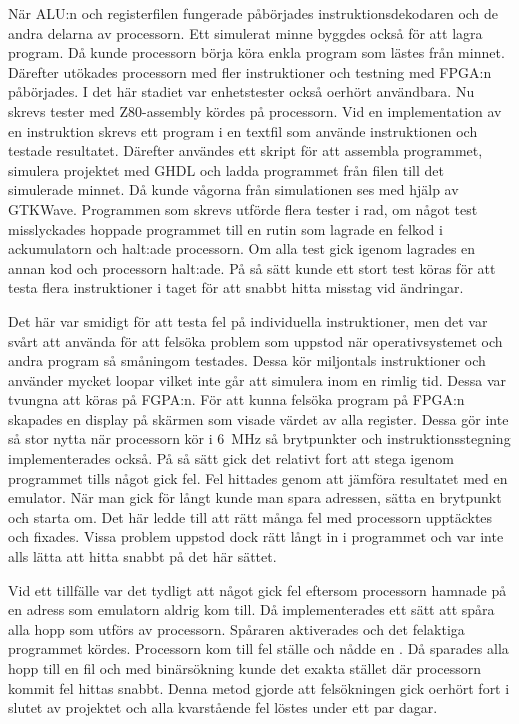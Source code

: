 \documentclass[main.tex]{subfiles}
\begin{document}
När ALU:n och registerfilen fungerade påbörjades instruktionsdekodaren och de
andra delarna av processorn. Ett simulerat minne byggdes också för att lagra
program. Då kunde processorn börja köra enkla program som lästes från minnet.
Därefter utökades processorn med fler instruktioner och testning med FPGA:n
påbörjades. I det här stadiet var enhetstester också oerhört användbara. Nu
skrevs tester med Z80-assembly kördes på processorn. Vid en implementation av
en instruktion skrevs ett program i en textfil som använde instruktionen och
testade resultatet. Därefter användes ett skript för att assembla programmet,
simulera projektet med GHDL och ladda programmet från filen till det simulerade
minnet. Då kunde vågorna från simulationen ses med hjälp av GTKWave.
Programmen som skrevs utförde flera tester i rad, om något test misslyckades
hoppade programmet till en rutin som lagrade en felkod i ackumulatorn och
halt:ade processorn. Om alla test gick igenom lagrades en annan kod och
processorn halt:ade. På så sätt kunde ett stort test köras för att testa flera
instruktioner i taget för att snabbt hitta misstag vid ändringar.

Det här var smidigt för att testa fel på individuella instruktioner, men det
var svårt att använda för att felsöka problem som uppstod när operativsystemet
och andra program så småningom testades. Dessa kör miljontals instruktioner och
använder mycket loopar vilket inte går att simulera inom en rimlig tid. Dessa
var tvungna att köras på FGPA:n. För att kunna felsöka program på FPGA:n
skapades en display på skärmen som visade värdet av alla register. Dessa gör
inte så stor nytta när processorn kör i \SI{6}{\mega\hertz} så brytpunkter och
instruktionsstegning implementerades också. På så sätt gick det relativt fort
att stega igenom programmet tills något gick fel. Fel hittades genom att
jämföra resultatet med en emulator. När man gick för långt kunde man spara
adressen, sätta en brytpunkt och starta om. Det här ledde till att rätt många
fel med processorn upptäcktes och fixades. Vissa problem uppstod dock rätt
långt in i programmet och var inte alls lätta att hitta snabbt på det här
sättet.

Vid ett tillfälle var det tydligt att något gick fel eftersom processorn
hamnade på en adress som emulatorn aldrig kom till. Då implementerades ett sätt
att spåra alla hopp som utförs av processorn. Spåraren aktiverades och det
felaktiga programmet kördes. Processorn kom till fel ställe och nådde en
. Då sparades alla hopp till en fil och med binärsökning kunde det
exakta stället där processorn kommit fel hittas snabbt. Denna metod gjorde att
felsökningen gick oerhört fort i slutet av projektet och alla kvarstående fel
löstes under ett par dagar.
\end{document}
